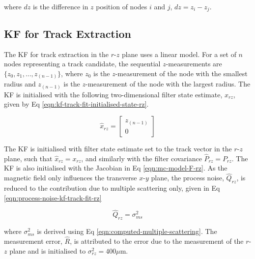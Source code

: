 where $dz$ is the difference in $z$ position of nodes $i$ and $j$, $dz = z_i - z_j$.






\subsection{KF for Track Extraction}

The KF for track extraction in the $r$-$z$ plane uses a linear model. For a set of $n$ nodes representing a track candidate, the sequential $z$-measurements are $\{z_0, z_1, ..., z_{(n-1)} \}$, where $z_0$ is the $z$-measurement of the node with the smallest radius and $z_{(n-1)}$ is the $z$-measurement of the node with the largest radius. The KF is initialised with the following two-dimensional filter state estimate, $\hat{x}_{rz}$, given by Eq \eqref{eqn:kf-track-fit-initialised-state-rz}.

\begin{equation}
\hat{x}_{rz} = \begin{bmatrix} z_{(n-1)} \\ 0 \end{bmatrix} 
\label{eqn:kf-track-fit-initialised-state-rz}
\end{equation}


The KF is initialised with filter state estimate set to the track vector in the $r$-$z$ plane, such that $\hat{x}_{rz} = x_{rz}$, and similarly with the filter covariance $\hat{P}_{rz} = P_{rz}$. The KF is also initialised with the Jacobian in Eq \eqref{eqn:mc-model-F-rz}. As the magnetic field only influences the transverse $x$-$y$ plane, the process noise, $\hat{Q}_{rz}$, is reduced to the contribution due to multiple scattering only, given in Eq \eqref{eqn:process-noise-kf-track-fit-rz}

\begin{equation}
\hat{Q}_{rz} = \sigma_{ms}^{2}
\label{eqn:process-noise-kf-track-fit-rz}
\end{equation}

where $\sigma_{ms}^{2}$ is derived using Eq \eqref{eqn:computed-multiple-scattering}. The measurement error, $\hat{R}$, is attributed to the error due to the measurement of the $r$-$z$ plane and is initialised to $\sigma_{rz}^2 = 400\mu$m.






